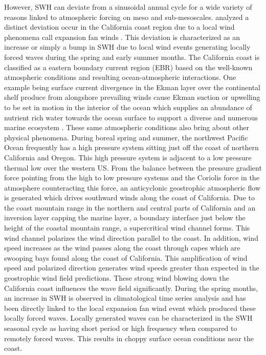 \documentclass[draft,linenumbers]{agujournal2018}
\begin{document}
However, SWH can deviate from a sinusoidal annual cycle for a wide variety of reasons linked to atmospheric forcing on meso and sub-mesoscales. \citet{villas2017characterization} analyzed a distinct deviation occur in the California coast region due to a local wind phenomena call expansion fan winds \cite{winant1988marine}. This deviation is characterized as an increase or simply a bump in SWH due to local wind events generating locally forced waves during the spring and early summer months. The California coast is classified as a eastern boundary current region (EBR) based on the well-known atmospheric conditions and resulting ocean-atmospheric interactions. One example being surface current divergence in the Ekman layer over the continental shelf produce from alongshore prevailing winds cause Ekman suction or upwelling to be set in motion in the interior of the ocean which supplies an abundance of nutrient rich water towards the ocean surface to support a diverse and numerous marine ecosystem \cite{marchesiello2003equilibrium}. These same atmospheric conditions also bring about other physical phenomena. 
During boreal spring and summer, the northwest Pacific Ocean frequently has a high pressure system sitting just off the coast of northern California and Oregon. This high pressure system is adjacent to a low pressure thermal low over the western US. From the balance between the pressure gradient force pointing from the high to low pressure systems and the Coriolis force in the atmosphere counteracting this force, an anticyclonic geostrophic atmospheric flow is generated which drives southward winds along the coast of California. Due to the coast mountain range in the northern and central parts of California and an inversion layer capping the marine layer, a boundary interface just below the height of the coastal mountain range, a supercritical wind channel forms. This wind channel polarizes the wind direction parallel to the coast. In addition, wind speed increases as the wind passes along the coast through capes which are swooping bays found along the coast of California. This amplification of wind speed and polarized direction generates wind speeds greater than expected in the geostrophic wind field predictions. These strong wind blowing down the California coast influences the wave field significantly. During the spring months, an increase in SWH is observed in climatological time series analysis and has been directly linked to the local expansion fan wind event which produced these locally forced waves. Locally generated waves can be characterized in the SWH seasonal cycle as having short period or high frequency when compared to remotely forced waves. This results in choppy surface ocean conditions near the coast. 
\end{document}
